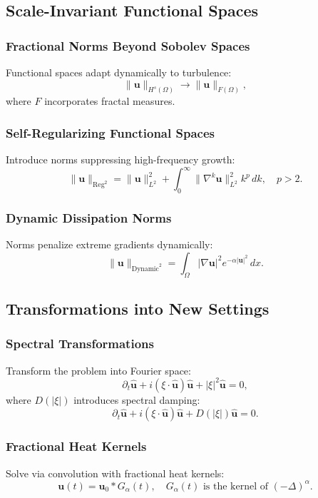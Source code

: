 \documentclass[12pt]{article}
\numberwithin{equation}{section}
\begin{document}
\subsection{Scale-Invariant Functional Spaces}
\subsubsection{Fractional Norms Beyond Sobolev Spaces}
Functional spaces adapt dynamically to turbulence:
\[
\|\mathbf{u}\|_{H^s(\Omega)} \to \|\mathbf{u}\|_{F(\Omega)},
\]
where $F$ incorporates fractal measures.

\subsubsection{Self-Regularizing Functional Spaces}
Introduce norms suppressing high-frequency growth:
\[
\|\mathbf{u}\|_{\text{Reg}^2} = \|\mathbf{u}\|_{L^2}^2 + \int_0^\infty \|\nabla^k \mathbf{u}\|_{L^2}^2 k^p \, dk, \quad p > 2.
\]

\subsubsection{Dynamic Dissipation Norms}
Norms penalize extreme gradients dynamically:
\[
\|\mathbf{u}\|_{\text{Dynamic}^2} = \int_\Omega |\nabla \mathbf{u}|^2 e^{-\alpha |\mathbf{u}|^2} \, dx.
\]

\subsection{Transformations into New Settings}
\subsubsection{Spectral Transformations}
Transform the problem into Fourier space:
\[
\partial_t \hat{\mathbf{u}} + i (\xi \cdot \hat{\mathbf{u}}) \hat{\mathbf{u}} + |\xi|^2 \hat{\mathbf{u}} = 0,
\]
where $D(|\xi|)$ introduces spectral damping:
\[
\partial_t \hat{\mathbf{u}} + i (\xi \cdot \hat{\mathbf{u}}) \hat{\mathbf{u}} + D(|\xi|)\hat{\mathbf{u}} = 0.
\]

\subsubsection{Fractional Heat Kernels}
Solve via convolution with fractional heat kernels:
\[
\mathbf{u}(t) = \mathbf{u}_0 * G_\alpha(t), \quad G_\alpha(t) \text{ is the kernel of } (-\Delta)^\alpha.
\]
\end{document}
